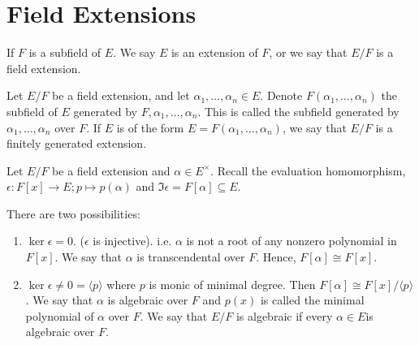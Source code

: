 \section{Field Extensions}

\begin{definition}
    If \(F\) is a subfield of \(E\). We say \(E\) is an extension of \(F\), or we say that \(E / F\) is a field extension.
\end{definition}

\begin{definition}
    Let \(E / F\) be a field extension, and let \(\alpha_1, \dots, \alpha_n \in E\). Denote \(F(\alpha_1, \dots, \alpha_n)\) the subfield of \(E\) generated by \(F, \alpha_1, \dots, \alpha_n\). This is called the subfield generated by \(\alpha_1, \dots, \alpha_n\) over \(F\). If \(E\) is of the form \(E = F(\alpha_1, \dots, \alpha_n)\), we say that \(E / F\) is a finitely generated extension.
\end{definition}


Let \(E / F\) be a field extension and \(\alpha \in E^\times\). Recall the evaluation homomorphism, \(\epsilon: F[x] \to E; p \mapsto p(\alpha)\) and \(\Im \epsilon = F[\alpha] \subseteq E\).

\begin{thrm-defn}
    There are two possibilities:
    \begin{enumerate}
        \item \(\ker \epsilon = 0\). (\(\epsilon\) is injective). i.e. \(\alpha\) is not a root of any nonzero polynomial in \(F[x]\). We say that \(\alpha\) is transcendental over \(F\). Hence, \(F[\alpha] \cong F[x]\).
        \item \(\ker \epsilon \neq 0 = \langle p \rangle\) where \(p\) is monic of minimal degree. Then \(F[\alpha] \cong F[x] / \langle p \rangle\). We say that \(\alpha\) is algebraic over \(F\) and \(p(x)\) is called the minimal polynomial of \(\alpha\) over \(F\). We say that \(E / F\) is algebraic if every \(\alpha \in E\)is algebraic over \(F\).
    \end{enumerate}
\end{thrm-defn}

